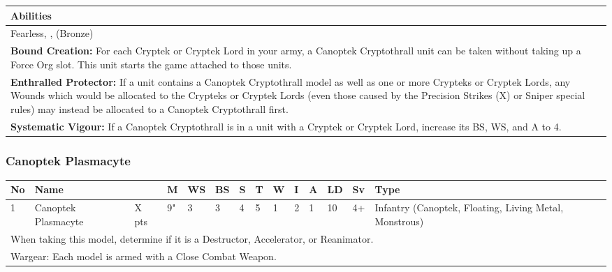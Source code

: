 \noindent
\begin{tabular}{||m{532pt}||}
	\hline
	Abilities \\
	\hline
	Fearless, \quickref{Reanimation Protocols}, \quickref{Soulless Hordes} (Bronze) \\
	\textbf{Bound Creation:} For each Cryptek or Cryptek Lord in your army, a Canoptek Cryptothrall unit can be taken without taking up a Force Org slot. This unit starts the game attached to those units. \\
	\textbf{Enthralled Protector:} If a unit contains a Canoptek Cryptothrall model as well as one or more Crypteks or Cryptek Lords, any Wounds which would be allocated to the Crypteks or Cryptek Lords (even those caused by the Precision Strikes (X) or Sniper special rules) may instead be allocated to a Canoptek Cryptothrall first. \\
	\textbf{Systematic Vigour:} If a Canoptek Cryptothrall is in a unit with a Cryptek or Cryptek Lord, increase its BS, WS, and A to 4. \\
	\hline
\end{tabular}


\newpage
\subsubsection{Canoptek Plasmacyte}

\noindent
\begin{tabular}{||m{10pt} m{90pt} m{30pt} m{11pt} m{11pt} m{11pt} m{11pt} m{11pt} m{11pt} m{11pt} m{11pt} m{11pt} m{11pt} m{135pt}||}
	\hline
	No & Name & & M & WS & BS & S & T & W & I & A & LD & Sv & Type \\
	\hline
	1 & Canoptek Plasmacyte & X pts & 9" & 3 & 3 & 4 & 5 & 1 & 2 & 1 & 10 & 4+ & Infantry (Canoptek, Floating, Living Metal, Monstrous) \\
	\hline
	\hline
	\multicolumn{14}{||Z{532 pt}||}{When taking this model, determine if it is a Destructor, Accelerator, or Reanimator.}\\	
	\hline
	\hline
	\multicolumn{14}{||Z{532 pt}||}{Wargear: Each model is armed with a Close Combat Weapon.} \\
	\hline
\end{tabular}

